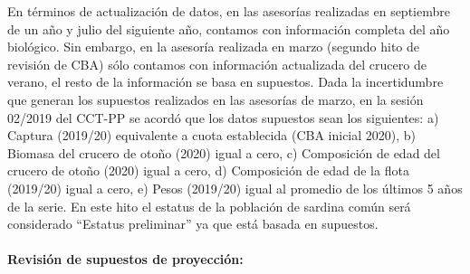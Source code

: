 \documentclass[
  spanish,
]{article}
\begin{document}
En términos de actualización de datos, en las asesorías realizadas en
septiembre de un año y julio del siguiente año, contamos con información
completa del año biológico. Sin embargo, en la asesoría realizada en
marzo (segundo hito de revisión de CBA) sólo contamos con información
actualizada del crucero de verano, el resto de la información se basa en
supuestos. Dada la incertidumbre que generan los supuestos realizados en
las asesorías de marzo, en la sesión 02/2019 del CCT-PP se acordó que
los datos supuestos sean los siguientes: a) Captura (2019/20)
equivalente a cuota establecida (CBA inicial 2020), b) Biomasa del
crucero de otoño (2020) igual a cero, c) Composición de edad del crucero
de otoño (2020) igual a cero, d) Composición de edad de la flota
(2019/20) igual a cero, e) Pesos (2019/20) igual al promedio de los
últimos 5 años de la serie. En este hito el estatus de la población de
sardina común será considerado ``Estatus preliminar'' ya que está basada
en supuestos.

\hypertarget{revisiuxf3n-de-supuestos-de-proyecciuxf3n}{%
\paragraph{Revisión de supuestos de
proyección:}\label{revisiuxf3n-de-supuestos-de-proyecciuxf3n}}
\end{document}
